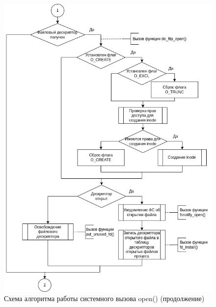 \documentclass[14pt,a4paper]{scrreprt}
\begin{document}
\begin{figure}[H]
	\begin{center}
		\includegraphics[scale=0.7]{assets/open-2.png}
	\end{center}
	\caption{Схема алгоритма работы системного вызова open() (продолжение)}
\end{figure}
\end{document}
